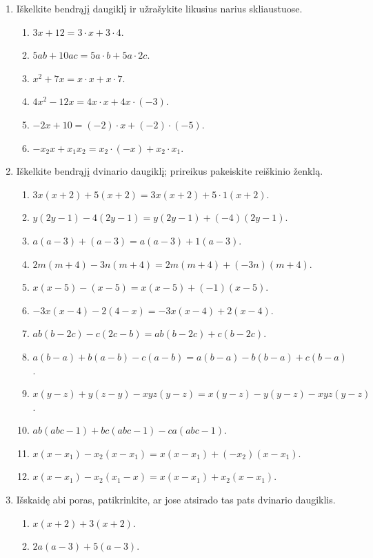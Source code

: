 \documentclass[11pt,a4paper]{scrartcl}
\begin{document}
\begin{enumerate}[label=\textbf{\arabic*.}, leftmargin=*]
    \item Iškelkite bendrąjį daugiklį ir užrašykite likusius narius skliaustuose.
    \begin{enumerate}[label={(\arabic*)}]
        \item $3x+12=3\cdot x+3\cdot4$.
        \item $5ab+10ac=5a\cdot b+5a\cdot2c$.
        \item $x^2+7x=x\cdot x+x\cdot7$.
        \item $4x^2-12x=4x\cdot x+4x\cdot(-3)$.
        \item $-2x+10=(-2)\cdot x+(-2)\cdot(-5)$.
        \item $-x_2x+x_1x_2=x_2\cdot(-x)+x_2\cdot x_1$.
    \end{enumerate}
    \item Iškelkite bendrąjį dvinario daugiklį; prireikus pakeiskite reiškinio ženklą.
    \begin{enumerate}[label={(\arabic*)}]
        \item $3x(x+2)+5(x+2)=3x(x+2)+5\cdot1(x+2)$.
        \item $y(2y-1)-4(2y-1)=y(2y-1)+(-4)(2y-1)$.
        \item $a(a-3)+(a-3)=a(a-3)+1(a-3)$.
        \item $2m(m+4)-3n(m+4)=2m(m+4)+(-3n)(m+4)$.
        \item $x(x-5)-(x-5)=x(x-5)+(-1)(x-5)$.
        \item $-3x(x-4)-2(4-x)=-3x(x-4)+2(x-4)$.
        \item $ab(b-2c)-c(2c-b)=ab(b-2c)+c(b-2c)$.
        \item $a(b-a)+b(a-b)-c(a-b)=a(b-a)-b(b-a)+c(b-a)$.
        \item $x(y-z)+y(z-y)-xyz(y-z)=x(y-z)-y(y-z)-xyz(y-z)$.
        \item $ab(abc-1)+bc(abc-1)-ca(abc-1)$.
        \item $x(x-x_1)-x_2(x-x_1)=x(x-x_1)+(-x_2)(x-x_1)$.
        \item $x(x-x_1)-x_2(x_1-x)=x(x-x_1)+x_2(x-x_1)$.
    \end{enumerate}
    \item Išskaidę abi poras, patikrinkite, ar jose atsirado tas pats dvinario daugiklis.
    \begin{enumerate}[label={(\arabic*)}]
        \item $x(x+2)+3(x+2)$.
        \item $2a(a-3)+5(a-3)$.

\end{enumerate}
\end{enumerate}
\end{document}
